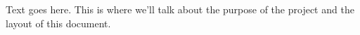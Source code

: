 
%
%
%
%


Text goes here.  This is where we'll talk about the purpose of the project and the layout of this document.





